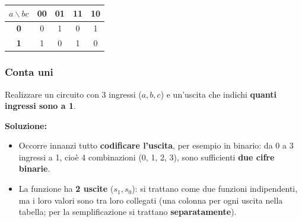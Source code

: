 \documentclass[12pt, a4paper]{article}
\begin{document}
\begin{center}
\renewcommand{\arraystretch}{1.25}
\begin{tabular}[t]{|c|c|c|c|c|}
\hline
\colorbox{gray!25}{\color{black}$a\backslash bc$} & \colorbox{gray!25}{\color{black}\textbf{00}} & \colorbox{gray!25}{\color{black}\textbf{01}} & \colorbox{gray!25}{\color{black}\textbf{11}} & \colorbox{gray!25}{\color{black}\textbf{10}} \\ \hline
\colorbox{gray!25}{\color{black}\textbf{0}} & 0 & 1 & 0 & 1 \\ \hline
\colorbox{gray!25}{\color{black}\textbf{1}} & 1 & 0 & 1 & 0 \\ \hline
\end{tabular}
\end{center}

\subsubsection{Conta uni}
\begin{tcolorbox}[colback=lightergray!10, colframe=tocsec, title=\textbf{Esercizio: conta uni}]
Realizzare un circuito con 3 ingressi ($a, b, c$) e un'uscita che indichi \textbf{quanti ingressi sono a 1}.
\end{tcolorbox}

\textbf{Soluzione:}
\begin{itemize}
    \item Occorre innanzi tutto \textbf{codificare l'uscita}, per esempio in binario: da 0 a 3 ingressi a 1, cioè 4 combinazioni (0, 1, 2, 3), sono sufficienti \textbf{due cifre binarie}.
    \item La funzione ha \textbf{2 uscite} ($s_1, s_0$): si trattano come due funzioni indipendenti, ma i loro valori sono tra loro collegati (una colonna per ogni uscita nella tabella; per la semplificazione si trattano \textbf{separatamente}).
\end{itemize}
\end{document}

